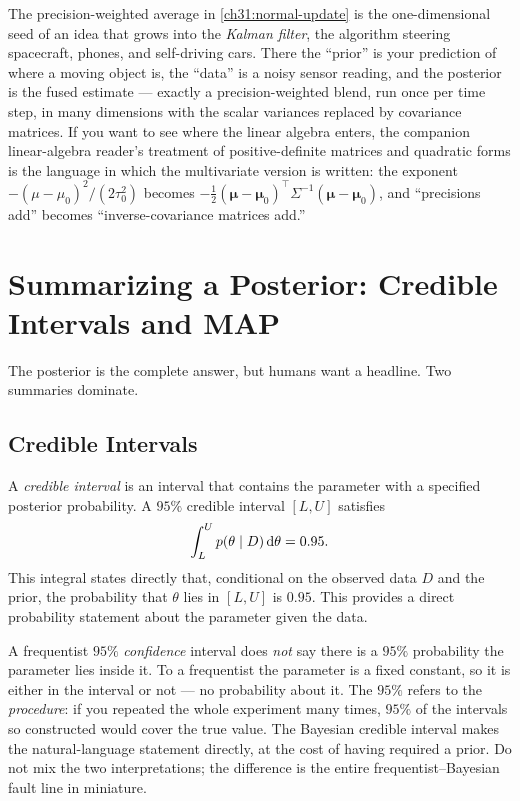 \begin{connectionbox}
The precision-weighted average in \eqref{ch31:normal-update} is the one-dimensional seed of
an idea that grows into the \emph{Kalman filter}, the algorithm steering spacecraft,
phones, and self-driving cars. There the ``prior'' is your prediction of where a moving
object is, the ``data'' is a noisy sensor reading, and the posterior is the fused estimate
--- exactly a precision-weighted blend, run once per time step, in many dimensions with the
scalar variances replaced by covariance matrices. If you want to see where the linear
algebra enters, the companion linear-algebra reader's treatment of positive-definite
matrices and quadratic forms is the language in which the multivariate version is written:
the exponent $-(\mu-\mu_0)^2/(2\tau_0^2)$ becomes $-\tfrac12(\boldsymbol\mu -
\boldsymbol\mu_0)^\top \Sigma^{-1}(\boldsymbol\mu - \boldsymbol\mu_0)$, and ``precisions
add'' becomes ``inverse-covariance matrices add.''
\end{connectionbox}

\section{Summarizing a Posterior: Credible Intervals and MAP}
\label{ch31:summaries}

The posterior is the complete answer, but humans want a headline. Two summaries dominate.

\subsection{Credible Intervals}

A \emph{credible interval} is an interval that contains the parameter with a specified
posterior probability. A $95\%$ credible interval $[L,U]$ satisfies
\[
  \int_{L}^{U} p(\theta\mid D)\,\mathrm{d}\theta = 0.95.
\]
This integral states directly that, conditional on the observed data $D$ and the prior, the
probability that $\theta$ lies in $[L,U]$ is $0.95$. This provides a direct probability statement
about the parameter given the data.

\begin{trapbox}
A frequentist $95\%$ \emph{confidence} interval does \emph{not} say there is a $95\%$
probability the parameter lies inside it. To a frequentist the parameter is a fixed
constant, so it is either in the interval or not --- no probability about it. The $95\%$
refers to the \emph{procedure}: if you repeated the whole experiment many times, $95\%$ of
the intervals so constructed would cover the true value. The Bayesian credible interval
makes the natural-language statement directly, at the cost of having required a prior. Do
not mix the two interpretations; the difference is the entire frequentist--Bayesian
fault line in miniature.
\end{trapbox}

